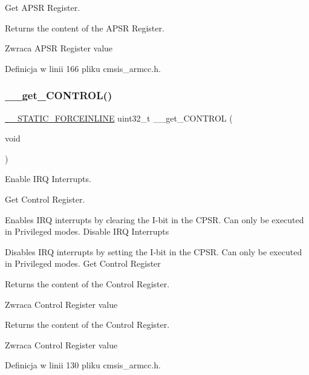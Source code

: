 Get A\+P\+SR Register. 

Returns the content of the A\+P\+SR Register. \begin{DoxyReturn}{Zwraca}
A\+P\+SR Register value 
\end{DoxyReturn}


Definicja w linii 166 pliku cmsis\+\_\+armcc.\+h.

\mbox{\label{group___c_m_s_i_s___core___reg_acc_functions_ga7dd5c942bee32f055b90153feb950f59}} 
\subsubsection{\texorpdfstring{\+\_\+\+\_\+get\+\_\+\+C\+O\+N\+T\+R\+O\+L()}{\_\_get\_CONTROL()}}
{\footnotesize\ttfamily \hyperlink{cmsis__iccarm_8h_ab904513442afdf77d4f8c74f23cbb040}{\+\_\+\+\_\+\+S\+T\+A\+T\+I\+C\+\_\+\+F\+O\+R\+C\+E\+I\+N\+L\+I\+NE} uint32\+\_\+t \+\_\+\+\_\+get\+\_\+\+C\+O\+N\+T\+R\+OL (\begin{DoxyParamCaption}\item[{void}]{ }\end{DoxyParamCaption})}



Enable I\+RQ Interrupts. 

Get Control Register.

Enables I\+RQ interrupts by clearing the I-\/bit in the C\+P\+SR. Can only be executed in Privileged modes. Disable I\+RQ Interrupts

Disables I\+RQ interrupts by setting the I-\/bit in the C\+P\+SR. Can only be executed in Privileged modes. Get Control Register

Returns the content of the Control Register. \begin{DoxyReturn}{Zwraca}
Control Register value
\end{DoxyReturn}
Returns the content of the Control Register. \begin{DoxyReturn}{Zwraca}
Control Register value 
\end{DoxyReturn}


Definicja w linii 130 pliku cmsis\+\_\+armcc.\+h.

